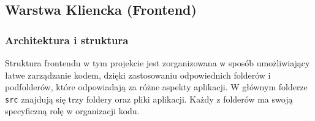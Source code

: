 \documentclass[twoside]{projektInzynierskiMS1}
\begin{document}
\newpage

\subsection{Warstwa Kliencka (Frontend)}

\subsubsection{Architektura i struktura}

\noindent
Struktura frontendu w tym projekcie jest zorganizowana w sposób umożliwiający łatwe zarządzanie kodem, dzięki zastosowaniu odpowiednich folderów i podfolderów, które odpowiadają za różne aspekty aplikacji. W głównym folderze \texttt{src} znajdują się trzy foldery oraz pliki aplikacji. Każdy z folderów ma swoją specyficzną rolę w organizacji kodu.
\end{document}

